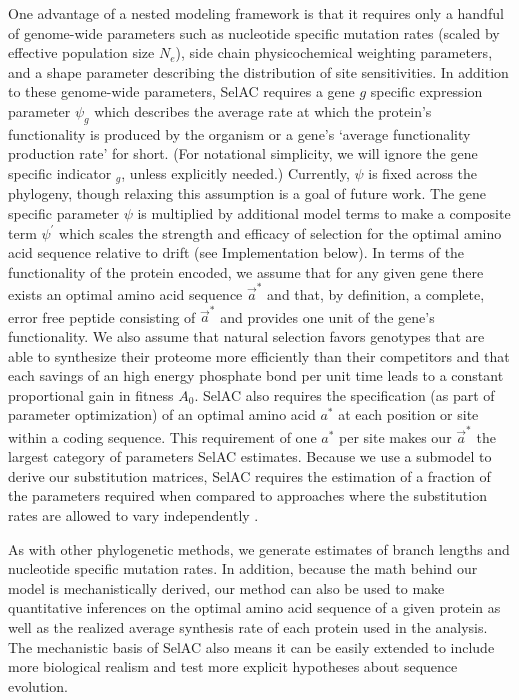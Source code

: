 \documentclass[12pt,letterpaper]{article}
\newcommand{\Ne}{\ensuremath{{N_e}}\xspace} %
\newcommand{\selac}{SelAC\xspace}
\newcommand{\aopt}{\ensuremath{a^*}\xspace}
\newcommand{\aoptvec}{\ensuremath{\Vec{a}^*}\xspace}
\newcommand{\psig}{\ensuremath{\psi_{g}}\xspace}
\newcommand{\psiprime}{\ensuremath{\psi^\prime}\xspace}
\begin{document}
One advantage of a nested modeling framework is that it requires only a handful of genome-wide parameters such as nucleotide specific mutation rates (scaled by effective population size \Ne), side chain physicochemical weighting parameters, and a shape parameter describing the distribution of site sensitivities.
In addition to these genome-wide parameters, \selac requires a gene $g$ specific expression parameter $\psig$ which describes the average rate at which the protein's functionality is produced by the organism or a gene's `average functionality production rate' for short.
(For notational simplicity, we will ignore the gene specific indicator $_g$, unless explicitly needed.)
Currently, $\psi$ is fixed across the phylogeny, though relaxing this assumption is a goal of future work.
The gene specific parameter $\psi$ is multiplied by additional model terms to make a composite term $\psiprime$ which scales the strength and efficacy of selection for the optimal amino acid sequence relative to drift (see Implementation below).
In terms of the functionality of the protein encoded, we assume that for any given gene there exists an optimal amino acid sequence \aoptvec and that, by definition, a complete, error free peptide consisting of \aoptvec and provides one unit of the gene's functionality.
We also assume that natural selection favors genotypes that are able to synthesize their proteome more efficiently than their competitors and that each savings of an high energy phosphate bond per unit time leads to a constant proportional gain in fitness $A_0$.
\selac also requires the specification (as part of parameter optimization) of an optimal amino acid \aopt at each position or site within a coding sequence.
This requirement of one \aopt per site makes our \aoptvec the largest category of parameters \selac estimates.
Because we use a submodel to derive our substitution matrices, \selac requires the estimation of a fraction of the parameters required when compared to approaches where the substitution rates are allowed to vary independently \citep{HalpernAndBruno1998,LartillotAndPhilippe2004,RodrigueAndLartillot2014}.

As with other phylogenetic methods, we generate estimates of branch lengths and nucleotide specific mutation rates.
In addition, because the math behind our model is mechanistically derived, our method can also be used to make quantitative inferences on the optimal amino acid sequence of a given protein as well as the realized average synthesis rate of each protein used in the analysis.
The mechanistic basis of \selac also means it can be easily extended to include more biological realism and test more explicit hypotheses about sequence evolution.
\end{document}
